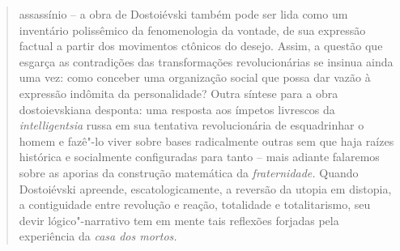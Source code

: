 {\begin{quote}
assassínio -- a obra de Dostoiévski também pode ser lida como um
inventário polissêmico da fenomenologia da vontade, de sua expressão
factual a partir dos movimentos ctônicos do desejo. Assim, a questão que
esgarça as contradições das transformações revolucionárias se insinua
ainda uma vez: como conceber uma organização social que possa dar vazão
à expressão indômita da personalidade? Outra síntese para a obra
dostoievskiana desponta: uma resposta aos ímpetos livrescos da
\emph{intelligentsia} russa em sua tentativa revolucionária de
esquadrinhar o homem e fazê"-lo viver sobre bases radicalmente outras sem
que haja raízes histórica e socialmente configuradas para tanto -- mais
adiante falaremos sobre as aporias da construção matemática da
\emph{fraternidade.} Quando Dostoiévski apreende, escatologicamente, a
reversão da utopia em distopia, a contiguidade entre revolução e reação,
totalidade e totalitarismo, seu devir lógico"-narrativo tem em mente tais
reflexões forjadas pela experiência da \emph{casa dos mortos. }


\end{quote}}
